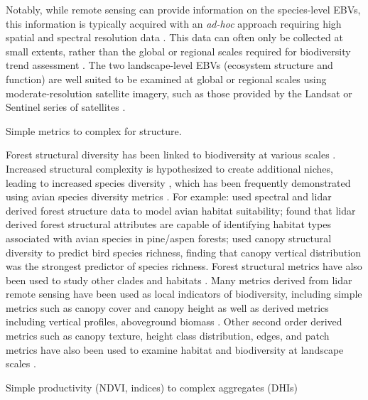 \documentclass[
  authoryear,
  review,
  3p,
  twocolumn]{elsarticle}
\begin{document}
Notably, while remote sensing can provide information on the
species-level EBVs, this information is typically acquired with an
\emph{ad-hoc} approach requiring high spatial and spectral resolution
data \citep{skidmore2021}. This data can often only be collected at
small extents, rather than the global or regional scales required for
biodiversity trend assessment \citep{valdez2023}. The two
landscape-level EBVs (ecosystem structure and function) are well suited
to be examined at global or regional scales using moderate-resolution
satellite imagery, such as those provided by the Landsat or Sentinel
series of satellites \citep{skidmore2021}.

Simple metrics to complex for structure.

Forest structural diversity has been linked to biodiversity at various
scales \citep{guo2017, bergen2009, gao2014}. Increased structural
complexity is hypothesized to create additional niches, leading to
increased species diversity \citep{bergen2009}, which has been
frequently demonstrated using avian species diversity metrics
\citep{macarthur1961}. For example: \citet{herniman2020} used spectral
and lidar derived forest structure data to model avian habitat
suitability; \citet{clawges2008} found that lidar derived forest
structural attributes are capable of identifying habitat types
associated with avian species in pine/aspen forests; \citet{goetz2007}
used canopy structural diversity to predict bird species richness,
finding that canopy vertical distribution was the strongest predictor of
species richness. Forest structural metrics have also been used to study
other clades and habitats \citep{davies2014, nelson2005}. Many metrics
derived from lidar remote sensing have been used as local indicators of
biodiversity, including simple metrics such as canopy cover and canopy
height as well as derived metrics including vertical profiles,
aboveground biomass \citep{lefsky1999}. Other second order derived
metrics such as canopy texture, height class distribution, edges, and
patch metrics have also been used to examine habitat and biodiversity at
landscape scales \citep{bergen2009}.

Simple productivity (NDVI, indices) to complex aggregates (DHIs)
\end{document}
